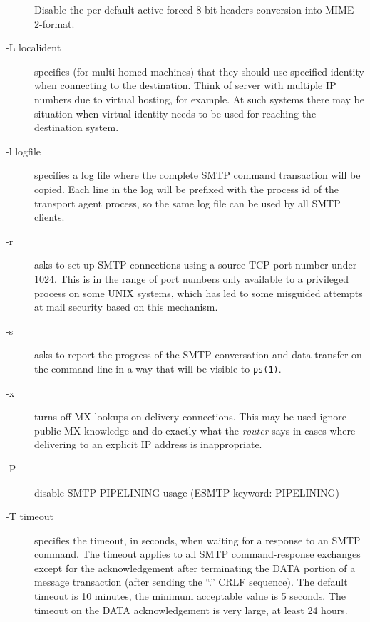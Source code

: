 \begin{description}
Disable the per default active forced 8-bit headers
conversion into MIME-2-format.



\item[-L localident] \mbox{}

specifies (for multi-homed machines) that they
should use specified identity when connecting to
the destination. Think of server with multiple IP
numbers due to virtual hosting, for example. At
such systems there may be situation when virtual
identity needs to be used for reaching the destination system.



\item[-l logfile] \mbox{}

specifies a log file where the complete SMTP command 
transaction will be copied. Each line in the
log will be prefixed with the process id of the
transport agent process, so the same log file can
be used by all SMTP clients.



\item[-r] \mbox{}

asks to set up SMTP connections using a source TCP
port number under 1024. This is in the range of
port numbers only available to a privileged process
on some UNIX systems, which has led to some 
misguided attempts at mail security based on this
mechanism.



\item[-s] \mbox{}

asks to report the progress of the SMTP conversation 
and data transfer on the command line in a way
that will be visible to {\tt ps(1)}.



\item[-x] \mbox{}

turns off MX lookups on delivery connections. This
may be used ignore public MX knowledge and do
exactly what the {\em router} says in cases where delivering 
to an explicit IP address is inappropriate.



\item[-P] \mbox{}

disable SMTP-PIPELINING usage (ESMTP keyword: PIPELINING)



\item[-T timeout] \mbox{}

specifies the timeout, in seconds, when waiting for
a response to an SMTP command. The timeout applies
to all SMTP command-response exchanges except for
the acknowledgement after terminating the DATA portion 
of a message transaction (after sending the
``.'' CRLF sequence). The default timeout is 10 
minutes, the minimum acceptable value is 5 seconds.
The timeout on the DATA acknowledgement is very
large, at least 24 hours.




\end{description}
